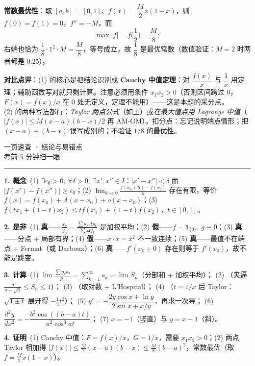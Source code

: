 \documentclass[10pt]{ctexart}
\newcommand{\eps}{\varepsilon}
\begin{document}
\noindent\textbf{常数最优性}：取 $[a,b]=[0,1]$、$f(x)=\dfrac{M}{2}x(1-x)$，则 $f(0)=f(1)=0$，$f''=-M$，而
\[
\max|f|=f\Big(\frac12\Big)=\frac M8;
\]
右端也恰为 $\dfrac18\cdot1^{2}\cdot M=\dfrac{M}{8}$，等号成立，故 $\dfrac18$ 是最优常数（数值验证：$M=2$ 时两者都是 $0.25$）。

\begin{cmpbox}
\textbf{对比点评}：(1) 的核心是把结论识别成 \textbf{Cauchy 中值定理}：对 $\dfrac{f(x)}{x}$ 与 $\dfrac1x$ 用定理；辅助函数写对就只剩计算。注意必须用条件 $x_1x_2>0$（否则区间跨过 $0$，$F(x)=f(x)/x$ 在 $0$ 处无定义，定理不能用）——这是本题的采分点。\\
(2) 的两种写法都行：\emph{Taylor 两点公式}（如上）或\emph{在最大值点用 Lagrange 中值}（$|f(x)|\le M(x-a)(b-x)/2$ 再 AM-GM）。扣分点：忘记说明端点情形；把 $(x-a)+(b-x)$ 误写成别的；不验证 $1/8$ 的最优性。
\end{cmpbox}

\newpage
\begin{center}
{\Large\heiti 一页速查 · 结论与易错点}\\[4pt]
{\footnotesize\color{black!60}考前 5 分钟扫一眼}
\end{center}
\vspace{-2pt}
\hrule
\vspace{6pt}
\small

\textbf{1. 概念}\ (1) $\exists\eps_0>0,\ \forall\delta>0,\ \exists x',x''\in I$：$|x'-x''|<\delta$ 而 $|f(x')-f(x'')|\ge\eps_0$；(2) $\lim_{h\to0}\frac{f(x_0+h)-f(x_0)}{h}$ 存在有限，等价 $f(x)=f(x_0)+A(x-x_0)+o(x-x_0)$；(3) $f(tx_1+(1-t)x_2)\le tf(x_1)+(1-t)f(x_2)$，$t\in[0,1]$。

\textbf{2. 是非}\ (1) \textbf{真}——$\frac{x_n}{y_n}=\frac{\sum a_k\Delta y_k}{\sum\Delta y_k}$ 是加权平均；(2) \textbf{假}——$f=\mathbf 1_{\{0\}},\ g\equiv0$；(3) \textbf{真}——分点 + 局部有界；(4) \textbf{假}——$x\cdot x=x^2$ 不一致连续；(5) \textbf{真}——最值不在端点 + Fermat（或 Darboux）；(6) \textbf{真}——$f'(x_0\pm0)$ 存在则等于 $f'(x_0)$，故不能是跳变。

\textbf{3. 计算}\
(1) $\displaystyle\lim\frac{\sum p_ka_k}{p_n}=\sum_{k=1}^\infty a_k=\lim S_n$（分部和 + 加权平均）；
(2) \boxed{1}（夹逼 $\frac{n}{n+\sqrt n}\le S_n\le1$）；
(3) （取对数 + L'Hospital）；
(4) （$t=1/x$ 后 Taylor：$\sqrt{1\pm t}$ 展开得 $-\frac14t^2$）；
(5) $y'=-\dfrac{2y\cos x+\ln y}{2\sin x+x/y}$，再求一次导；
(6) $\dfrac{d^2y}{dx^2}=-\dfrac{b^2\cos((b-a)t)}{a^2\cos^3 at}$；
(7) $x=-1$（竖直）与 $y=x-1$（斜）。

\textbf{4. 证明}\
(1) Cauchy 中值：$F=f(x)/x$，$G=1/x$，需要 $x_1x_2>0$；(2) 两点 Taylor 相加得 $|f(x)|\le\frac M2(x-a)(b-x)\le\frac M8(b-a)^2$，常数最优（取 $f=\frac M2 x(1-x)$）。
\end{document}
